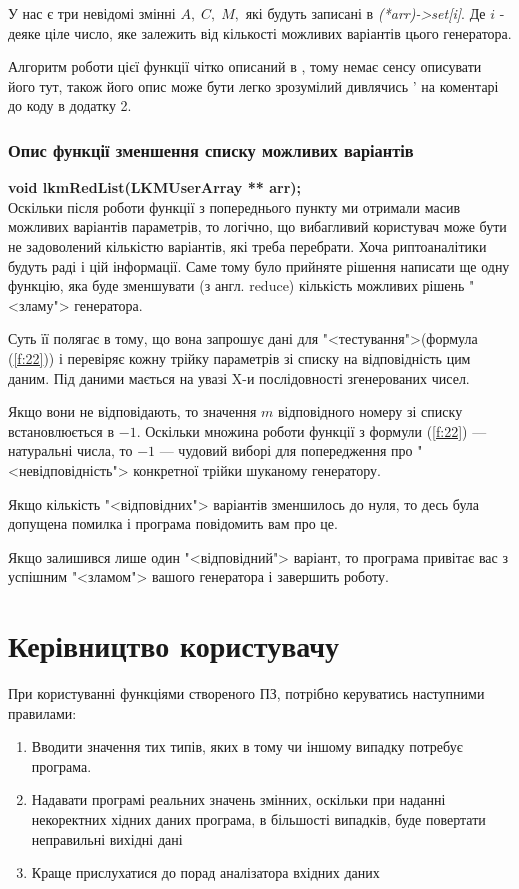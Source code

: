 \documentclass[oneside,final,14pt]{extreport}
\begin{document}
\begin{large}
У нас є три невідомі змінні $A, \;C, \;M,$ які будуть записані в 
{\itshape (*arr)->set[i]}. Де $i$ - деяке ціле число, яке залежить від кількості 
можливих варіантів цього генератора.

Алгоритм роботи цієї функції чітко описаний в \cite{b9}, тому немає сенсу 
	описувати його тут, також його опис може бути легко зрозумілий дивлячись '
	на коментарі до коду в додатку 2.
\subsection{Опис функції зменшення списку можливих варіантів}\label{ss:335}
{\bfseries void lkmRedList(LKMUserArray ** arr);}\\

Оскільки після роботи функції з попереднього пункту ми отримали масив 
	можливих варіантів параметрів, то логічно, що вибагливий користувач може
	 бути не задоволений кількістю варіантів, які треба перебрати. Хоча 
	 риптоаналітики будуть раді і цій інформації.
	 Саме тому було прийняте рішення написати ще одну функцію, яка буде зменшувати 
	(з англ. reduce) кількість можливих рішень "<зламу"> генератора. 

	Суть її полягає в тому, що вона запрошує дані для "<тестування">(формула (\ref{f:22})) 
	і перевіряє кожну трійку параметрів зі списку на відповідність цим даним. Під даними 
	мається на увазі X-и послідовності згенерованих чисел. 
	
	Якщо вони не відповідають, то 
	значення $m$ відповідного номеру зі списку встановлюється в $-1$. Оскільки множина роботи 
	функції з формули (\ref{f:22}) --- натуральні числа, то $-1$ --- чудовий виборі для попередження 
	про "<невідповідність"> конкретної трійки шуканому генератору.

	Якщо кількість "<відповідних"> варіантів зменшилось до нуля, то десь була допущена 
	помилка і програма повідомить вам про це.
	
	Якщо залишився лише один "<відповідний"> варіант, то програма привітає вас з успішним 
	"<зламом"> вашого генератора і завершить роботу.

\chapter{Керівництво користувачу}\label{c:4}

При користуванні функціями створеного ПЗ, потрібно керуватись наступними правилами:
\begin{enumerate}
	\item
Вводити значення тих типів, яких в тому чи іншому випадку потребує програма.
\item 
Надавати програмі реальних значень змінних, оскільки при наданні некоректних 
хідних даних програма, в більшості випадків, буде повертати неправильні вихідні дані
\item
Краще прислухатися до порад аналізатора вхідних даних
\end{enumerate}


\end{large}
\end{document}
